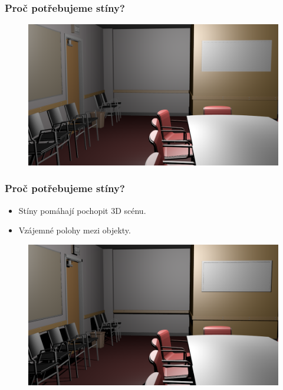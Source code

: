 \begin{frame}
  \frametitle{Proč potřebujeme stíny?}
  \begin{figure}[h]
    \includegraphics[width=11.5cm,keepaspectratio]{pics/shadows/whyShadows/conferenceNoShadows}
  \end{figure}
\end{frame}

\begin{frame}
  \frametitle{Proč potřebujeme stíny?}
  \begin{itemize}
    \item Stíny pomáhají pochopit 3D scénu.
    \item Vzájemné polohy mezi objekty.
  \end{itemize}
  \begin{figure}[h]
    \includegraphics[width=11.5cm,keepaspectratio]{pics/shadows/whyShadows/conferenceShadows}
  \end{figure}
\end{frame}

